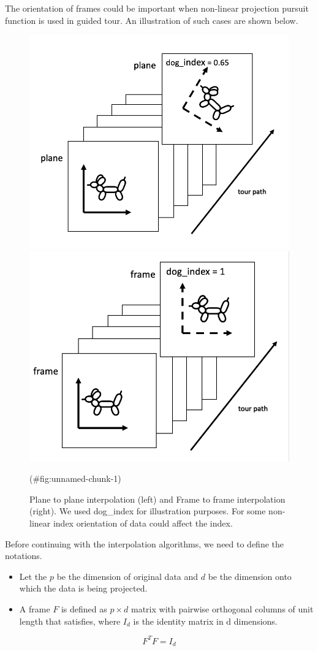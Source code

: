The orientation of frames could be important when non-linear projection pursuit function is used in guided tour. An illustration of such cases are shown below.

\begin{figure}

{\centering \includegraphics[width=0.5\linewidth]{plane} \includegraphics[width=0.5\linewidth]{frame} 

}

\caption{Plane to plane interpolation (left) and Frame to frame interpolation (right). We used dog_index for illustration purposes. For some non-linear index orientation of data could affect the index.}(\#fig:unnamed-chunk-1)
\end{figure}

Before continuing with the interpolation algorithms, we need to define the notations.

\begin{itemize}
\item
  Let the \(p\) be the dimension of original data and \(d\) be the dimension onto which the data is being projected.
\item
  A frame \(F\) is defined as \(p\times d\) matrix with pairwise orthogonal columns of unit length that satisfies, where \(I_d\) is the identity matrix in d dimensions.
\end{itemize}

\[F^TF = I_d\]

